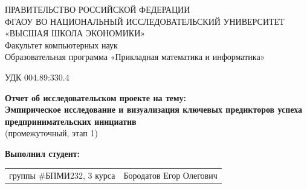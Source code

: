 \begin{titlepage}
\newpage

{
\begin{center}
ПРАВИТЕЛЬСТВО РОССИЙСКОЙ ФЕДЕРАЦИИ\\
ФГАОУ ВО НАЦИОНАЛЬНЫЙ ИССЛЕДОВАТЕЛЬСКИЙ УНИВЕРСИТЕТ\\
«ВЫСШАЯ ШКОЛА ЭКОНОМИКИ»
\\
\bigskip
Факультет компьютерных наук\\
Образовательная программа «Прикладная математика и информатика»
\end{center}
}

\vspace{2em}
УДК 004.89:330.4 %
\vspace{4em}

\begin{center}
{\bf Отчет об исследовательском проекте на тему:}\\
{\bf Эмпирическое исследование и визуализация ключевых предикторов успеха предпринимательских инициатив}\\
(промежуточный, этап 1)
\end{center}

\vspace{2em}

{\bf Выполнил студент: \vspace{2mm}}

{
\begin{tabular}{l@{\hskip 1.5cm}l}
группы \#БПМИ232, 3 курса & Бородатов Егор Олегович \\
\end{tabular}}



\end{titlepage}
